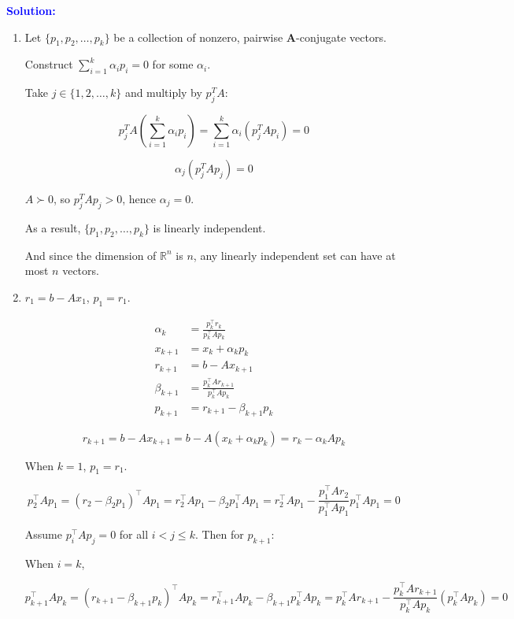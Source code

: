 \documentclass[11pt,a4paper]{article}
\newcommand{\solution}{\par\medskip
    \textcolor{blue}{\textbf{Solution:}}\par\smallskip}
\begin{document}
\solution

\begin{enumerate}
    \item[1. ]
    
    Let $\{p_1, p_2, \dots, p_k\}$ be a collection of nonzero, pairwise $\mathbf{A}$-conjugate vectors.

    Construct $\sum_{i=1}^k \alpha_i p_i = 0$ for some $\alpha_i$.

    Take $j \in \{1, 2, \dots, k\}$ and multiply by $p_j^T A$:

    $$
    p_j^T A \left( \sum_{i=1}^k \alpha_i p_i \right) = \sum_{i=1}^k \alpha_i (p_j^T A p_i) = 0
    $$

    $$
    \alpha_j (p_j^T A p_j) = 0
    $$

    $A \succ 0$, so $p_j^T A p_j > 0$, hence $\alpha_j = 0$.

    As a result, $\{p_1, p_2, \dots, p_k\}$ is linearly independent.

    And since the dimension of $\mathbb{R}^n$ is $n$, any linearly independent set can have at most $n$ vectors.

    \item[2. ]
    
    $r_1 = b - A x_1$, $p_1 = r_1$.

    $$
    \begin{aligned}
    \alpha_k &= \frac{p_k^\top r_k}{p_k^\top A p_k} \\
    x_{k+1} &= x_k + \alpha_k p_k \\
    r_{k+1} &= b - A x_{k+1} \\
    \beta_{k+1} &= \frac{p_k^\top A r_{k+1}}{p_k^\top A p_k} \\
    p_{k+1} &= r_{k+1} - \beta_{k+1} p_k
    \end{aligned}
    $$

    $$
    r_{k+1} = b - A x_{k+1} = b - A (x_k + \alpha_k p_k) = r_k - \alpha_k A p_k
    $$

    When $k = 1$, $p_1 = r_1$.

    $$
    p_2^\top A p_1
    = (r_2 - \beta_2 p_1)^\top A p_1
    = r_2^\top A p_1 - \beta_2 p_1^\top A p_1
    = r_2^\top A p_1 - \frac{p_1^\top A r_2}{p_1^\top A p_1} p_1^\top A p_1
    =0
    $$

    Assume $p_i^\top A p_j = 0$ for all $i < j \leq k$. Then for $p_{k+1}$:

    When $i = k$,

    $$
    p_{k+1}^\top A p_k
    = (r_{k+1} - \beta_{k+1} p_k)^\top A p_k
    = r_{k+1}^\top A p_k - \beta_{k+1} p_k^\top A p_k
    = p_k^\top A r_{k+1} - \frac{p_k^\top A r_{k+1}}{p_k^\top A p_k} (p_k^\top A p_k)
    = 0
    $$


\end{enumerate}
\end{document}
